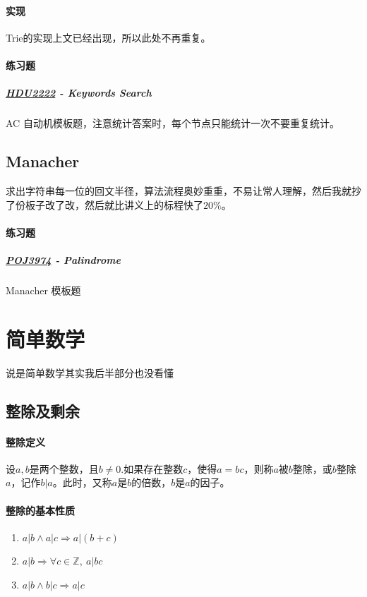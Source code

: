 \documentclass[]{cpp}
\begin{document}
\paragraph{实现}
	Trie的实现上文已经出现，所以此处不再重复。
\paragraph{练习题}
\subparagraph{\href{http://acm.hdu.edu.cn/showproblem.php?pid=2222}{HDU2222} - Keywords Search}
AC 自动机模板题，注意统计答案时，每个节点只能统计一次不要重复统计。
\subsection{Manacher}
求出字符串每一位的回文半径，算法流程奥妙重重，不易让常人理解，然后我就抄了份板子改了改，然后就比讲义上的标程快了$20\%$。
\paragraph{练习题}
\subparagraph{\href{http://poj.org/problem?id=3974}{POJ3974} - Palindrome}
Manacher 模板题
\section{简单数学}
说是简单数学其实我后半部分也没看懂\\
\subsection{整除及剩余}
\paragraph{整除定义}
	设$a,b$是两个整数，且$b\neq0$.如果存在整数$c$，使得$a=bc$，则称$a$被$b$整除，或$b$整除$a$，记作$b|a$。此时，又称$a$是$b$的倍数，$b$是$a$的因子。
\paragraph{整除的基本性质}
	\begin{enumerate}
		\item $a|b \land a|c \Rightarrow a|(b+c)$
		\item $a|b \Rightarrow \forall c\in\mathbb{Z},\ a|bc$
		\item $a|b \land b|c \Rightarrow a|c$
	\end{enumerate}
\end{document}
